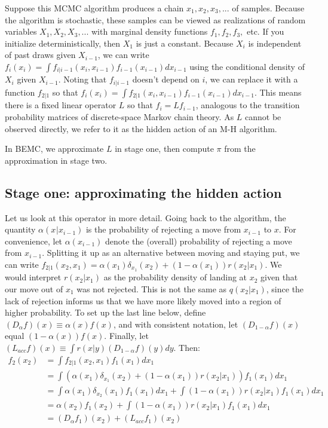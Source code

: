 \documentclass{article}
\begin{document}
Suppose this MCMC algorithm produces a chain $ x_1, x_2, x_3, ...$ of samples. Because the algorithm is stochastic, these samples can be viewed as realizations of random variables $X_1, X_2, X_3, ...$ with marginal density functions $f_1, f_2, f_3, $ etc. If you initialize deterministically, then $X_1$ is just a constant. Because $X_i$ is independent of past draws given $X_{i-1}$, we can write $f_i(x_i) = \int f_{i|i-1}(x_{i},x_{i-1})f_{i-1}(x_{i-1})dx_{i-1}$ using the conditional density of $X_i$ given $X_{i-1}$. Noting that $f_{i|i-1}$ doesn't depend on $i$, we can replace it with a function $f_{2|1}$ so that $f_i(x_i) = \int f_{2|1}(x_i, x_{i-1})f_{i-1}(x_{i-1})dx_{i-1}$. This means there is a fixed linear operator $L$ so that $f_{i} = Lf_{i-1}$, analogous to the transition probability matrices of discrete-space Markov chain theory. As $L$ cannot be observed directly, we refer to it as the hidden action of an M-H algorithm. 

In BEMC, we approximate $L$ in stage one, then compute $\pi$ from the approximation in stage two. 

\subsection{Stage one: approximating the hidden action}

Let us look at this operator in more detail. Going back to the algorithm, the quantity $\alpha(x_{}|x_{i-1})$ is the probability of rejecting a move from $x_{i-1}$ to $x$. For convenience, let $\alpha(x_{i-1})$ denote the (overall) probability of rejecting a move from $x_{i-1}$. Splitting it up as an alternative between moving and staying put, we can write $f_{2|1}(x_2, x_1) = \alpha(x_1)\delta_{x_1}(x_2) + (1-\alpha(x_1))r(x_2|x_1)$. We would interpret $r(x_2|x_1)$ as the probability density of landing at $x_2$ given that our move out of $x_1$ was not rejected. This is not the same as $q(x_2|x_1)$, since the lack of rejection informs us that we have more likely moved into a region of higher probability. To set up the last line below, define $(D_{\alpha}f)(x)\equiv \alpha(x)f(x)$, and with consistent notation, let $(D_{1-\alpha}f)(x)$ equal $(1-\alpha(x))f(x)$. Finally, let $(L_{acc}f)(x)\equiv \int r(x|y)(D_{1-\alpha}f)(y)dy$. Then:
\begin{align*}
 f_2(x_2) &= \int f_{2|1}(x_2, x_1)f_1(x_1)dx_1 \\
&= \int (\alpha(x_1)\delta_{x_1}(x_2) + (1-\alpha(x_1))r(x_2|x_1))f_1(x_1)dx_1 \\
&= \int \alpha(x_1)\delta_{x_2}(x_1)f_1(x_1)dx_1 + \int (1-\alpha(x_1))r(x_2|x_1)f_1(x_1)dx_1 \\
&=  \alpha(x_2)f_1(x_2) + \int (1-\alpha(x_1))r(x_2|x_1)f_1(x_1)dx_1 \\
&=  (D_{\alpha}f_1)(x_2) + (L_{acc}f_1)(x_2) \\
\end{align*}
\end{document}
